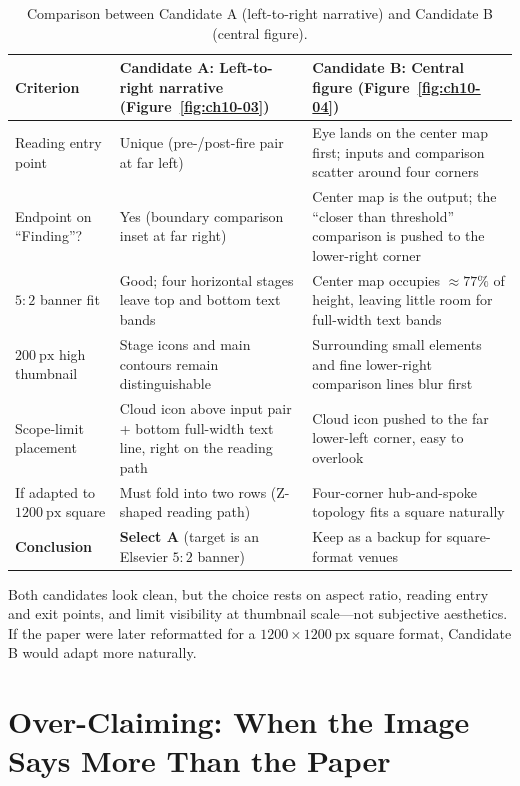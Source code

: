 \begin{table}[htbp]\centering\footnotesize
\setlength{\tabcolsep}{3pt}
\renewcommand{\arraystretch}{1.15}
\caption{Comparison between Candidate A (left-to-right narrative) and Candidate B (central figure).}\label{tab:ch10-04-ab}
\begin{tabularx}{\linewidth}{@{}>{\raggedright\arraybackslash}p{25mm}YY@{}}
\toprule
\textbf{Criterion} & \textbf{Candidate A: Left-to-right narrative (Figure~\ref{fig:ch10-03})} & \textbf{Candidate B: Central figure (Figure~\ref{fig:ch10-04})} \\
\midrule
Reading entry point & Unique (pre-/post-fire pair at far left) & Eye lands on the center map first; inputs and comparison scatter around four corners \\
Endpoint on ``Finding''? & Yes (boundary comparison inset at far right) & Center map is the output; the ``closer than threshold'' comparison is pushed to the lower-right corner \\
$5:2$ banner fit & Good; four horizontal stages leave top and bottom text bands & Center map occupies $\approx 77\%$ of height, leaving little room for full-width text bands \\
$200\ \text{px}$ high thumbnail & Stage icons and main contours remain distinguishable & Surrounding small elements and fine lower-right comparison lines blur first \\
Scope-limit placement & Cloud icon above input pair + bottom full-width text line, right on the reading path & Cloud icon pushed to the far lower-left corner, easy to overlook \\
If adapted to $1200\ \text{px}$ square & Must fold into two rows (Z-shaped reading path) & Four-corner hub-and-spoke topology fits a square naturally \\
\midrule
\textbf{Conclusion} & \textbf{Select A} (target is an Elsevier $5:2$ banner) & Keep as a backup for square-format venues \\
\bottomrule
\end{tabularx}
\end{table}

Both candidates look clean, but the choice rests on aspect ratio, reading entry and exit points, and limit visibility at thumbnail scale---not subjective aesthetics. If the paper were later reformatted for a $1200 \times 1200\ \text{px}$ square format, Candidate B would adapt more naturally.

\section{Over-Claiming: When the Image Says More Than the Paper}

